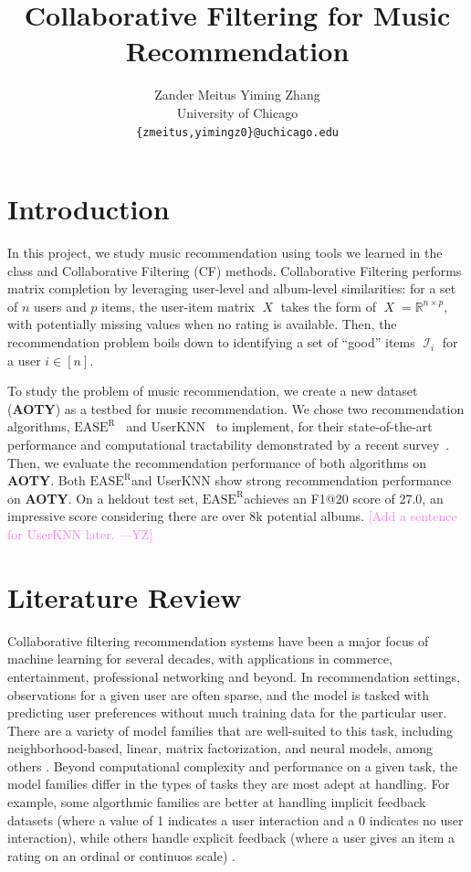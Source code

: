 \documentclass{article}
\title{Collaborative Filtering for Music Recommendation}
\author{
  Zander Meitus \qquad Yiming Zhang \\
  University of Chicago \\
  \texttt{\{zmeitus,yimingz0\}@uchicago.edu}
}
\newcommand{\aoty}{{\bf AOTY}\xspace}
\DeclareMathOperator{\X}{\mathit{X}}
\DeclareMathOperator{\I}{\mathcal{I}}
\newcommand{\easer}{$\text{EASE}^\text{R}$}
\newcommand{\userknn}{UserKNN\xspace}
\newcommand{\yiming}[1]{\textcolor{violet}{[#1 ---\textsc{YZ}]}}
\begin{document}
\maketitle

\section{Introduction}

In this project, we study music recommendation using tools we learned in the
 class and Collaborative Filtering (CF) methods.
Collaborative Filtering performs matrix completion by leveraging user-level and
 album-level similarities: for a set of $n$ users and $p$ items, the user-item
 matrix $\X$ takes the form of $\X = \mathbb{R}^{n \times p}$, with potentially
 missing values when no rating is available.
Then, the recommendation problem boils down to identifying a set of ``good''
 items $\I_i$ for a user $i \in [n]$.

To study the problem of music recommendation, we create a new dataset (\aoty)
 as a testbed for music recommendation.
We chose two recommendation algorithms,
 \easer~\citep{steckEmbarrassinglyShallowAutoencoders2019} and
 \userknn~\citep{resnickGroupLensOpenArchitecture1994} to implement, for their
 state-of-the-art performance and computational tractability demonstrated by a
 recent survey~\citep{anelliTopNRecommendationAlgorithms2022}.
Then, we evaluate the recommendation performance of both algorithms on \aoty.
Both \easer and \userknn show strong recommendation performance on \aoty.
On a heldout test set, \easer achieves an F1@20 score of 27.0, an impressive
 score considering there are over 8k potential albums.
\yiming{Add a sentence for \userknn later.}

\section{Literature Review}
Collaborative filtering recommendation systems have been a major focus of
 machine learning for several decades, with applications in commerce,
 entertainment, professional networking and beyond.
In recommendation settings, observations for a given user are often sparse, and
 the model is tasked with predicting user preferences without much training data
 for the particular user.
There are a variety of model families that are well-suited to this task,
 including neighborhood-based, linear, matrix factorization, and neural models,
 among others \citep{anelliTopNRecommendationAlgorithms2022}.
Beyond computational complexity and performance on a given task, the model
 families differ in the types of tasks they are most adept at handling.
For example, some algorthmic families are better at handling implicit feedback
 datasets (where a value of 1 indicates a user interaction and a 0 indicates no
 user interaction), while others handle explicit feedback (where a user gives an
 item a rating on an ordinal or continuos scale)
 \citep{steckEmbarrassinglyShallowAutoencoders2019}.
\end{document}
